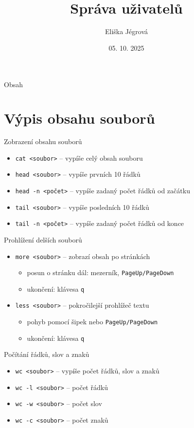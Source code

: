 \documentclass{beamer}
\title{Správa uživatelů}
\author{Eliška Jégrová}
\date{05. 10. 2025}
\begin{document}
	
	\frame{\titlepage}
	
	\begin{frame}{Obsah}
		\tableofcontents
	\end{frame}
	
	
\section{Výpis obsahu souborů}

\begin{frame}{Zobrazení obsahu souborů}
	\begin{itemize}
		\item \texttt{cat <soubor>} – vypíše celý obsah souboru
		\item \texttt{head <soubor>} – vypíše prvních 10 řádků
		\item \texttt{head -n <počet>} – vypíše zadaný počet řádků od začátku
		\item \texttt{tail <soubor>} – vypíše posledních 10 řádků
		\item \texttt{tail -n <počet>} – vypíše zadaný počet řádků od konce
	\end{itemize}
\end{frame}

\begin{frame}{Prohlížení delších souborů}
	\begin{itemize}
		\item \texttt{more <soubor>} – zobrazí obsah po stránkách
		\begin{itemize}
			\item posun o stránku dál: mezerník, \texttt{PageUp/PageDown}
			\item ukončení: klávesa \texttt{q}
		\end{itemize}
		\item \texttt{less <soubor>} – pokročilejší prohlížeč textu
		\begin{itemize}
			\item pohyb pomocí šipek nebo \texttt{PageUp/PageDown}
			\item ukončení: klávesa \texttt{q}
		\end{itemize}
	\end{itemize}
\end{frame}

\begin{frame}{Počítání řádků, slov a znaků}
	\begin{itemize}
		\item \texttt{wc <soubor>} – vypíše počet řádků, slov a znaků
		\item \texttt{wc -l <soubor>} – počet řádků
		\item \texttt{wc -w <soubor>} – počet slov
		\item \texttt{wc -c <soubor>} – počet znaků
	\end{itemize}
\end{frame}
\end{document}
